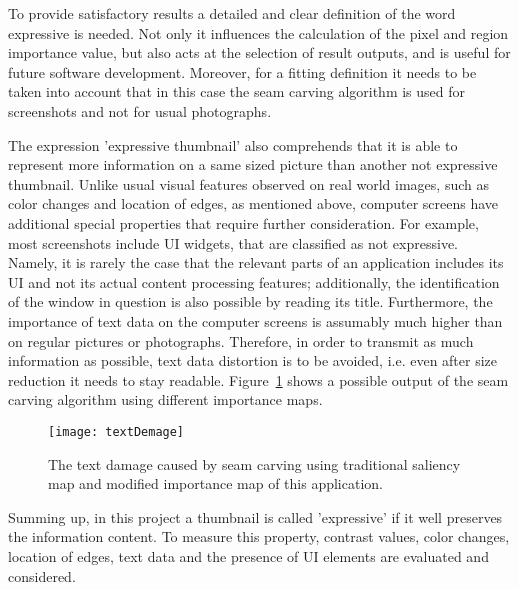 \documentclass[draft,final]{vutinfth} %
\begin{document}
	To provide satisfactory results a detailed and clear definition of the word expressive is needed.
	Not only it influences the calculation of the pixel and region importance value, but also acts at the selection of result outputs, and is useful for future software development.
	Moreover, for a fitting definition it needs to be taken into account that in this case the seam carving algorithm is used for screenshots and not for usual photographs.\par 
	The expression 'expressive thumbnail' also comprehends that it is able to represent more information on a same sized picture than another not expressive thumbnail.
	Unlike usual visual features observed on real world images, such as color changes and location of edges, as mentioned above, computer screens have additional special properties that require further consideration.
	For example, most screenshots include UI widgets, that are classified as not expressive.
	Namely, it is rarely the case that the relevant parts of an application includes its UI and not its actual content processing features; additionally, the identification of the window in question is also possible by reading its title.
	Furthermore, the importance of text data on the computer screens is assumably much higher than on regular pictures or photographs. 
	Therefore, in order to transmit as much information as possible, text data distortion is to be avoided, i.e. even after size reduction it needs to stay readable.
	Figure~\ref{fig:textDamage} shows a possible output of the seam carving algorithm using different importance maps.\par 
	\begin{figure}[H]
		\centering		
		\texttt{[image: textDemage]}
		\caption{The text damage caused by seam carving using traditional saliency map and modified importance map of this application. }
		\label{fig:textDamage}
	\end{figure} 
	Summing up, in this project a thumbnail is called 'expressive' if it well preserves the information content.
	To measure this property, contrast values, color changes, location of edges, text data and the presence of UI elements are evaluated and considered. 
	
	
\end{document}
